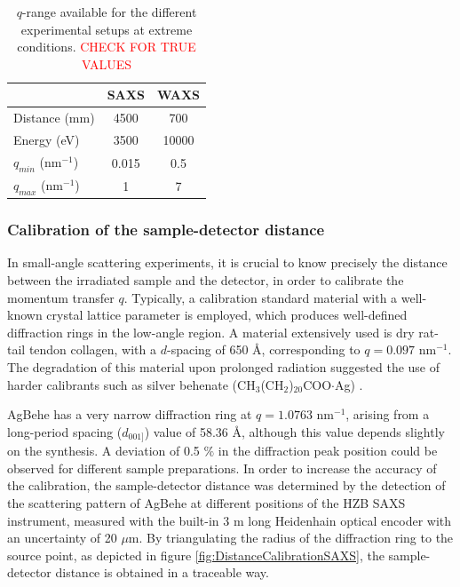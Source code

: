 \begin{table}[]
\centering
\caption{$q$-range available for the different experimental setups at extreme conditions. \textcolor{red}{CHECK FOR TRUE VALUES}}
\label{tab:qrange}
\begin{tabular}{|l|c|c|}
\hline
              & \textbf{SAXS} & \textbf{WAXS} \\ \hline
Distance (mm) & 4500          & 700           \\ \hline
Energy (eV)   & 3500          & 10000         \\ \hline
$q_{min}$ (nm$^{-1}$)   & 0.015         & 0.5           \\ \hline
$q_{max}$ (nm$^{-1}$)   & 1             & 7             \\ \hline
\end{tabular}
\end{table}

\subsubsection{Calibration of the sample-detector distance}

In small-angle scattering experiments, it is crucial to know precisely the distance between the irradiated sample and the detector, in order to calibrate the momentum transfer $q$. Typically, a calibration standard material with a well-known crystal lattice parameter is employed, which produces well-defined diffraction rings in the low-angle region. A material extensively used is dry rat-tail tendon collagen, with a $d$-spacing of 650 \AA \citep{amenitsch_performance_1997}, corresponding to $q=0.097$ nm$^{-1}$. The degradation of this material upon prolonged radiation suggested the use of harder calibrants such as silver behenate (CH$_3$(CH$_2$)$_{20}$COO$\cdot$Ag) \citep{huang_x-ray_1993}.

AgBehe has a very narrow diffraction ring at $q=1.0763$ nm$^{-1}$, arising from a long-period spacing ($d_{001]}$) value of 58.36 \AA \citep{blanton_jcpdsinternational_1995}, although this value depends slightly on the synthesis. A deviation of 0.5 $\%$ in the diffraction peak position could be observed for different sample preparations. In order to increase the accuracy of the calibration, the sample-detector distance was determined by the detection of the scattering pattern of AgBehe at different positions of the HZB SAXS instrument, measured with the built-in 3 m long Heidenhain optical encoder with an uncertainty of 20 $\mu$m. By triangulating the radius of the diffraction ring to the source point, as depicted in figure \ref{fig:DistanceCalibrationSAXS}, the sample-detector distance is obtained in a traceable way.

